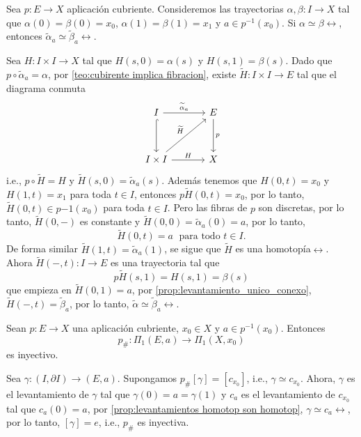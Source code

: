 \begin{prop}
\label{prop:levantamientos homotop son homotop}
    Sea $p:E\to X$ aplicación cubriente. Consideremos las trayectorias $\alpha,\beta:I\to X$ tal que $\alpha(0)=\beta(0)=x_0$, $\alpha(1)=\beta(1)=x_1$ y $a\in p^{-1}(x_0)$. Si $\alpha\simeq\beta\rel$, entonces $\widetilde{\alpha}_{a}\simeq\widetilde{\beta}_a\rel$.
\end{prop}
\begin{dem}
    Sea $H:I\times I\to X$ tal que $H(s,0)=\alpha(s)$ y $H(s,1)=\beta(s)$. Dado que $p\circ\widetilde{\alpha}_a=\alpha$, por \ref{teo:cubirente implica fibracion}, existe $\widetilde{H}:I\times I\to E$ tal que el diagrama conmuta
    \begin{equation*}
        \begin{tikzcd}[row sep=1.2cm, column sep=1.2cm]
            I
            \arrow[r,"\widetilde{\alpha}_a"] \arrow[hook,d] & E\arrow[d, "p"]\\
            I\times I \arrow[r, "H"]\arrow[ur, "\widetilde{H}"] & X
        \end{tikzcd}
    \end{equation*}
    i.e., $p\circ\widetilde{H}=H$ y $\widetilde{H}(s,0)=\widetilde{\alpha}_a(s)$. Además tenemos que $H(0,t)=x_0$ y $H(1,t)=x_1$ para toda $t\in I$, entonces $p\widetilde{H}(0,t)=x_0$, por lo tanto, $\widetilde{H}(0,t)\in p{-1}(x_0)$ para toda $t\in I$. Pero las fibras de $p$ son discretas, por lo tanto, $\widetilde{H}(0,-)$ es constante y $\widetilde{H}(0,0)=\widetilde{\alpha}_{a}(0)=a$, por lo tanto, 
    $$\widetilde{H}(0,t)=a\; \text{ para todo } t\in I.$$ 
    De forma similar $\widetilde{H}(1,t)=\widetilde{\alpha}_a(1)$, se sigue que $\widetilde{H}$ es una homotopía$\rel$. Ahora $\widetilde{H}(-,t):I\to E$ es una trayectoria tal que
    \begin{equation*}
        p\widetilde{H}(s,1)=H(s,1)=\beta(s)
    \end{equation*}
    que empieza en $\widetilde{H}(0,1)=a$, por \ref{prop:levantamiento_unico_conexo}, $\widetilde{H}(-,t)=\widetilde{\beta}_a$, por lo tanto, $\widetilde{\alpha}\simeq\widetilde{\beta}_a\rel$.
\end{dem}
\begin{coro}
    Sean $p:E\to X$ una aplicación cubriente, $x_0\in X$ y $a\in p^{-1}(x_0)$. Entonces 
    $$p_{\#}:\Pi_1(E,a)\to\Pi_1(X,x_0)$$ 
    es inyectivo.
\end{coro}
\begin{dem}
    Sea $\gamma:(I,\partial I)\to (E,a)$. Supongamos $p_\#[\gamma]=[c_{x_0}]$, i.e., $\gamma\simeq c_{x_0}$. Ahora, $\gamma$ es el levantamiento de $\gamma$ tal que $\gamma(0)=a=\gamma(1)$ y $c_a$ es el levantamiento de $c_{x_0}$ tal que $c_a(0)=a$, por \ref{prop:levantamientos homotop son homotop}, $\gamma\simeq c_a\rel$, por lo tanto, $[\gamma]=e$, i.e., $p_\#$ es inyectiva.
\end{dem}
